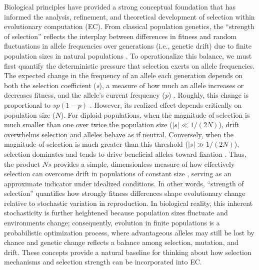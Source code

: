 
Biological principles have provided a strong conceptual foundation that has informed the analysis, refinement, and theoretical development of selection within evolutionary computation (EC).
From classical population genetics, the ``strength of selection'' reflects the interplay between differences in fitness and random fluctuations in allele frequencies over generations (i.e., genetic drift) due to finite population sizes in natural populations \citep{lynch2016genetic, kimura1985neutral, ohta1992nearly}.
To operationalize this balance, we must first quantify the deterministic pressure that selection exerts on allele frequencies.
The expected change in the frequency of an allele each generation depends on both the selection coefficient (\textit{s}), a measure of how much an allele increases or decreases fitness, and the allele's current frequency (\textit{p}) \citep{crow2017introduction}.
Roughly, this change is proportional to $s p (1 - p)$ \citep{crow2017introduction}.
However, its realized effect depends critically on population size ($N$).
For diploid populations, when the magnitude of selection is much smaller than one over twice the population size ($|s| \ll 1/(2N)$), drift overwhelms selection and alleles behave as if neutral.
Conversely, when the magnitude of selection is much greater than this threshold ($|s| \gg 1/(2N)$), selection dominates and tends to drive beneficial alleles toward fixation \citep{crow2017introduction}.
Thus, the product $N s$ provides a simple, dimensionless measure of how effectively selection can overcome drift in populations of constant size \citep{gravel2016selection}, serving as an approximate indicator under idealized conditions.
In other words, ``strength of selection'' quantifies how strongly fitness differences shape evolutionary change relative to stochastic variation in reproduction.
In biological reality, this inherent stochasticity is further heightened because population sizes fluctuate and environments change; consequently, evolution in finite populations is a probabilistic optimization process, where advantageous alleles may still be lost by chance and genetic change reflects a balance among selection, mutation, and drift.
These concepts provide a natural baseline for thinking about how selection mechanisms and selection strength can be incorporated into EC.

